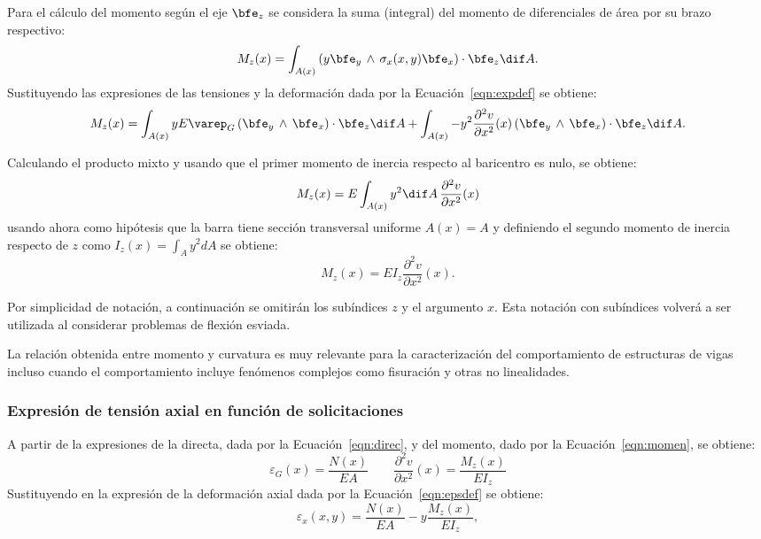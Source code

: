 Para el cálculo del momento según el eje $\bfe_z$ se considera la suma (integral) del momento de diferenciales de área por su brazo respectivo:
%
\begin{equation}
M_z (x) = \int_{A(x)} \left( y \bfe_y \,  \wedge \, \sigma_x (x,y) \bfe_x \right) \cdot \bfe_z \dif A.
\end{equation}
%
Sustituyendo las expresiones de las tensiones y la deformación dada por la Ecuación~\eqref{eqn:expdef} se obtiene:
%
\begin{equation}
M_z (x) = \int_{A(x)} y E \varep_{G} \left( \bfe_y \,  \wedge \, \bfe_x \right) \cdot \bfe_z \dif A + \int_{A(x)} -y^2 \frac{\partial^2 v}{\partial x^2} (x)  \left( \bfe_y \,  \wedge \, \bfe_x \right) \cdot \bfe_z \dif A.
\end{equation}

Calculando el producto mixto y usando que el primer momento de inercia respecto al baricentro es nulo, se obtiene:
%
\begin{equation}
M_z (x) = E \int_{A(x)} y^2 \dif A \,  \frac{\partial^2 v}{\partial x^2} (x)
\end{equation}
%
usando ahora como hipótesis que la barra tiene sección transversal uniforme $A(x)=A$ y definiendo el segundo momento de inercia respecto de $z$ como $I_z(x) = \int_{A} y^2 dA$ se obtiene:
%
\begin{equation}\label{eqn:momen}
\boxed{
M_z (x) = E I_z \frac{\partial^2 v}{\partial x^2}(x).
}
\end{equation}

Por simplicidad de notación, a continuación se omitirán los subíndices $z$ y el argumento $x$. %
%
Esta notación con subíndices volverá a ser utilizada al considerar problemas de flexión esviada.

La relación obtenida entre momento y curvatura es muy relevante para la caracterización del comportamiento de estructuras de vigas incluso cuando el comportamiento incluye fenómenos complejos como fisuración y otras no linealidades.


\subsubsection{Expresión de tensión axial en función de solicitaciones}


%
A partir de la expresiones de la directa, dada por la Ecuación~\eqref{eqn:direc}, y del momento, dado por la Ecuación~\eqref{eqn:momen}, se obtiene:
%
\begin{equation}
\varepsilon_G(x) = \frac{	N (x) }{E A}
\qquad
\frac{\partial^2 v}{\partial x^2}(x) = \frac{	M_z (x) }{E I_z} 
\end{equation}
%
Sustituyendo en la expresión de la deformación axial dada por la Ecuación~\eqref{eqn:epsdef} se obtiene:
%
\begin{equation}
\varepsilon_x(x,y) = \frac{	N (x) }{E A}  -y  \frac{ M_z (x) }{E I_z},
\end{equation}

